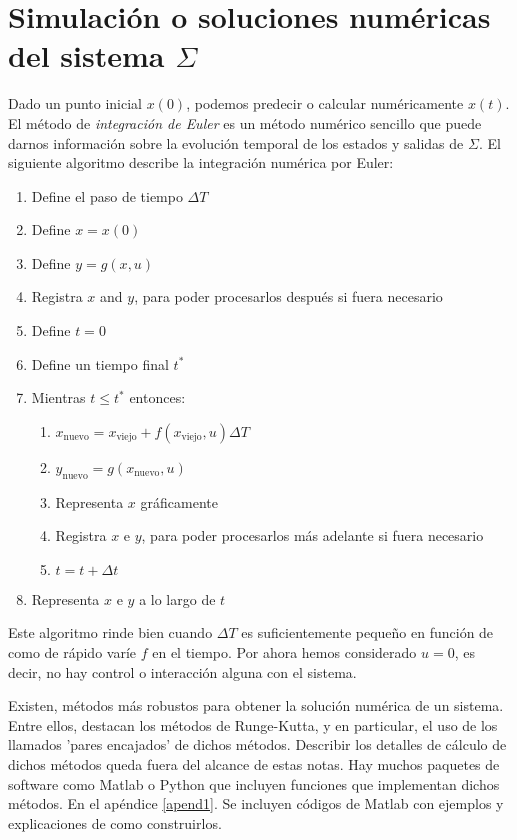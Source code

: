 \section{Simulación o soluciones numéricas del sistema $\Sigma$}
Dado un punto inicial $x(0)$, podemos predecir o calcular numéricamente $x(t)$. El método de \emph{integración de Euler} es un método numérico sencillo que puede darnos información sobre la evolución temporal de los estados y salidas de $\Sigma$. El siguiente algoritmo describe la integración numérica por Euler:
\begin{algo}
	\begin{enumerate}
		\item Define el paso de tiempo $\Delta T$
		\item Define $x = x(0)$
		\item Define $y = g(x,u)$
		\item Registra $x$ and $y$, para poder procesarlos después si fuera necesario
		\item Define $t = 0$
		\item Define un tiempo final $t^*$
		\item Mientras $t \leq t^*$ entonces:
			\begin{enumerate}
				\item $x_{\text{nuevo}} = x_{\text{viejo}} + f(x_{\text{viejo}},u)\Delta T$
				\item $y_{\text{nuevo}} = g(x_{\text{nuevo}},u)$
				\item Representa $x$ gráficamente
				\item Registra $x$ e $y$, para poder procesarlos más adelante si fuera necesario
				\item $t = t + \Delta t$
			\end{enumerate}
		\item Representa $x$ e $y$ a lo largo de $t$
	\end{enumerate}
\end{algo}

Este algoritmo rinde bien cuando $\Delta T$ es suficientemente pequeño en función de como de rápido varíe $f$ en el tiempo. Por ahora hemos considerado $u=0$, es decir, no hay control o interacción alguna con el sistema.

Existen, métodos más robustos para obtener la solución numérica de un sistema. Entre ellos, destacan los métodos de Runge-Kutta, y en particular, el uso de los llamados 'pares encajados' de dichos métodos. Describir los detalles de cálculo de dichos métodos queda fuera del alcance de estas notas. Hay muchos paquetes de software como Matlab o Python que incluyen funciones que implementan dichos métodos. En  el apéndice \ref{apend1}. Se incluyen códigos de Matlab con ejemplos y explicaciones de como construirlos.

